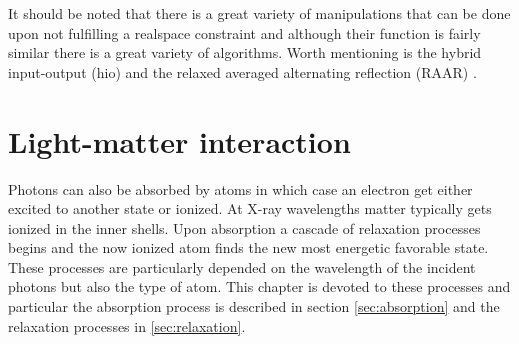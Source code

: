 It should be noted that there is a great variety of manipulations that can be done upon not fulfilling a realspace constraint and although their function is fairly similar there is a great variety of algorithms. Worth mentioning is the hybrid input-output (hio) \cite{Fienup-1978-OL} and the relaxed averaged alternating reflection (RAAR) \cite{Luke-2005-IP}.
%
%
%
%
\section{Light-matter interaction}\label{sec:light-matter-interaction}
Photons can also be absorbed by atoms in which case an electron get either excited to another state or ionized. At X-ray wavelengths matter typically gets ionized in the inner shells. Upon absorption a cascade of relaxation processes begins and the now ionized atom finds the new most energetic favorable state. These processes are particularly depended on the wavelength of the incident photons but also the type of atom. This chapter is devoted to these processes and particular the absorption process is described in section \ref{sec:absorption} and the relaxation processes in \ref{sec:relaxation}.
